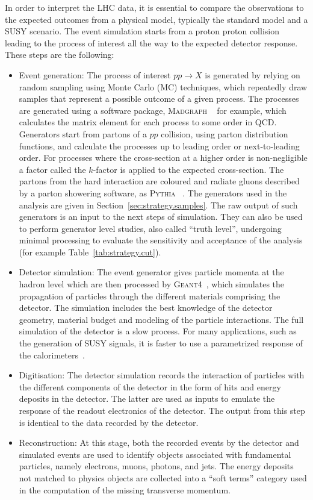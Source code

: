 In order to interpret the LHC data, it is essential to compare the observations to the expected outcomes from a physical model, typically the standard model and a SUSY scenario.
The event simulation starts from a proton proton collision leading to the process of interest all the way to the expected detector response. 
These steps are the following:

\begin{itemize} 
\item Event generation: The process of interest $pp \to X$ is generated by relying on random sampling using Monte Carlo (MC) techniques, which repeatedly draw samples that represent 
  a possible outcome of a given process. The processes are generated using a software package, \textsc{Madgraph} ~\cite{Alwall:2014hca} for example, which calculates the matrix element 
  for each process to some order in QCD. Generators start from partons of a $pp$ collision, using parton distribution functions, and calculate the processes up to leading order or next-to-leading order. 
  For processes where the cross-section at a higher order is non-negligible a factor called the $k$-factor is applied to the expected cross-section. 
  The partons from the hard interaction are coloured and radiate gluons described by a parton showering software, as \textsc{Pythia} ~\cite{Sjostrand:2007gs}. The generators used in the analysis 
  are given in Section~\ref{sec:strategy.samples}. 
  The raw output of such generators 
  is an input to the next steps of simulation. They can also be used to perform generator level studies, also called ``truth level'', undergoing minimal processing to evaluate the 
  sensitivity and  acceptance of the analysis (for example Table~\ref{tab:strategy.cut}).
\item Detector simulation: The event generator gives particle momenta at the hadron level which are then processed by \textsc{Geant4}~\cite{Agostinelli:2002hh}, which simulates
  the propagation of particles through the different materials comprising the detector. The simulation includes  the best knowledge of the detector 
geometry, material budget and modeling of the particle interactions.
The full simulation of the detector is a slow process. For many applications, such as the generation 
  of SUSY signals, it is faster to use a parametrized response of the calorimeters~\cite{ATL-PHYS-PUB-2010-013}.
\item Digitisation: The detector simulation records the interaction of particles with the different components of the detector in the form of hits and energy deposits in the detector.
  The latter are used as inputs to emulate the response of the readout electronics of the detector. The output from this step is identical to the data recorded by the detector.
\item Reconstruction: At this stage, both the recorded events by the detector and simulated events are used to identify objects associated with fundamental particles, namely 
  electrons, muons, photons, and jets. The energy deposits not matched to physics objects are collected into a ``soft terms'' category used in the computation of the missing transverse momentum.  
\end{itemize} 

